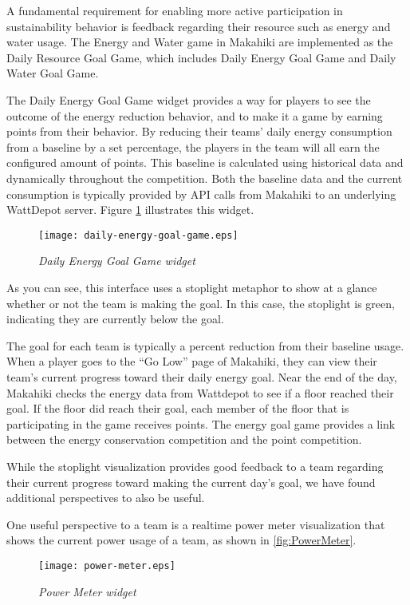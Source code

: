 A fundamental requirement for enabling more active participation in sustainability behavior is feedback regarding their resource such as energy and water usage. The Energy and Water game in Makahiki are implemented as the Daily Resource Goal Game, which includes Daily Energy Goal Game and Daily Water Goal Game.

The Daily Energy Goal Game widget provides a way for players to see the outcome of the energy reduction behavior, and to make it a game by earning points from their behavior. By reducing their teams' daily energy consumption from a baseline by a set percentage, the players in the team will all earn the configured amount of points. This baseline is calculated using historical data and dynamically throughout the competition. Both the baseline data and the current consumption is typically provided by API calls from Makahiki to an underlying WattDepot server.
Figure \ref{fig:DailyEnergyGoal} illustrates this widget.

\begin{figure}[!ht]
  \center
  \texttt{[image: daily-energy-goal-game.eps]}
  \caption{\em Daily Energy Goal Game widget}
  \label{fig:DailyEnergyGoal}
\end{figure}

As you can see, this interface uses a stoplight metaphor to show at a glance whether or not the team is making the goal. In this case, the stoplight is green, indicating they are currently below the goal.

The goal for each team is typically a percent reduction from their baseline usage. When a player goes to the ``Go Low'' page of Makahiki, they can view their team's current progress toward their daily energy goal. Near the end of the day, Makahiki checks the energy data from Wattdepot to see if a floor reached their goal. If the floor did reach their goal, each member of the floor that is participating in the game receives points. The energy goal game provides a link between the energy conservation competition and the point competition.

While the stoplight visualization provides good feedback to a team regarding their current progress toward making the current day's goal, we have found additional perspectives to also be useful.

One useful perspective to a team is a realtime power meter visualization that shows the current power usage of a team, as shown in \autoref{fig:PowerMeter}.

\begin{figure}[!ht]
  \center
  \texttt{[image: power-meter.eps]}
  \caption{\em Power Meter widget}
  \label{fig:PowerMeter}
\end{figure}

